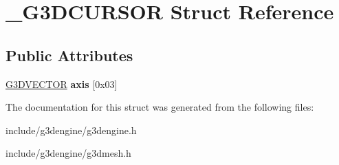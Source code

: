 \hypertarget{struct__G3DCURSOR}{}\section{\+\_\+\+G3\+D\+C\+U\+R\+S\+OR Struct Reference}
\label{struct__G3DCURSOR}
\subsection*{Public Attributes}
\begin{DoxyCompactItemize}
\item 
\mbox{\label{struct__G3DCURSOR_a61007713a2e09a5eb79f23afd6b3570e}} 
\hyperlink{struct__G3DVECTOR}{G3\+D\+V\+E\+C\+T\+OR} {\bfseries axis} \mbox{[}0x03\mbox{]}
\end{DoxyCompactItemize}


The documentation for this struct was generated from the following files\+:\begin{DoxyCompactItemize}
\item 
include/g3dengine/g3dengine.\+h\item 
include/g3dengine/g3dmesh.\+h\end{DoxyCompactItemize}
